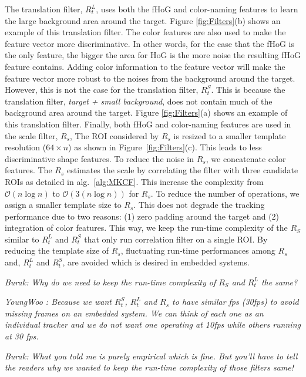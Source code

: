 \documentclass[10pt,twocolumn,letterpaper]{article}
\begin{document}
The translation filter, $R_{t}^{L}$, uses both the fHoG
\cite{felzenszwalb2010object} and color-naming \cite{van2009learning}
features to learn the large background area around the target. Figure
\ref{fig:Filters}(b) shows an example of this translation filter. The
color features are also used to make the feature vector more
discriminative. In other words, for the case that the fHoG is the only
feature, the bigger the area for HoG is the more noise the resulting
fHoG feature contains. Adding color information to the feature vector
will make the feature vector more robust to the noises from the
background around the target. However, this is not the case for the
translation filter, $R_{t}^{S}$. This is because the translation filter, {\it target + small background}, 
does not contain much of the background area around the target. Figure
\ref{fig:Filters}(a) shows an example of this translation filter. 
Finally, both fHoG and color-naming features are used in the scale filter, $R_{s}$, 
The ROI considered by $R_{s}$ is resized to a smaller template resolution ($64\times n$) as shown in Figure~\ref{fig:Filters}(c). 
This leads to less discriminative shape features. To reduce the noise in $R_{s}$, we concatenate color features. 
The $R_{s}$ estimates the scale by correlating the filter with three candidate ROIs as detailed in
alg.~\ref{alg:MKCF}.  This increase the complexity from $\mathcal{O}(n\log n)$ to $\mathcal{O}(3(n\log n))$ for $R_{s}$. 
To reduce the number of operations, we assign a smaller template size to $R_{s}$. 
This does not degrade the tracking performance due to two reasons: (1) zero padding around the target 
and (2) integration of color features. This way, we keep the run-time complexity of
the $R_{S}$ similar to $R_{t}^{L}$ and $R_{t}^{S}$ that only run
correlation filter on a single ROI. By reducing the template size of $R_{s}$, fluctuating run-time
performances among $R_{s}$ and, $R_{t}^{L}$ and $R_{t}^{S}$, are avoided which 
is desired in embedded systems.

{\it Burak: Why do we need to keep the run-time complexity
  of $R_{S}$ and $R_{t}^{L}$ the same?} 

{\it YoungWoo : Because we want $R_{t}^{S}$, $R_{t}^{L}$ and $R_{s}$
  to have similar fps (30fps) to avoid missing frames on an embedded
  system. We can think of each one as an individual tracker and we do
  not want one operating at 10fps while others running at 30 fps.}

{\it Burak: What you told me is purely empirical which is fine. But
  you'll have to tell the readers why we wanted to keep the run-time
  complexity of those filters same!}
\end{document}
